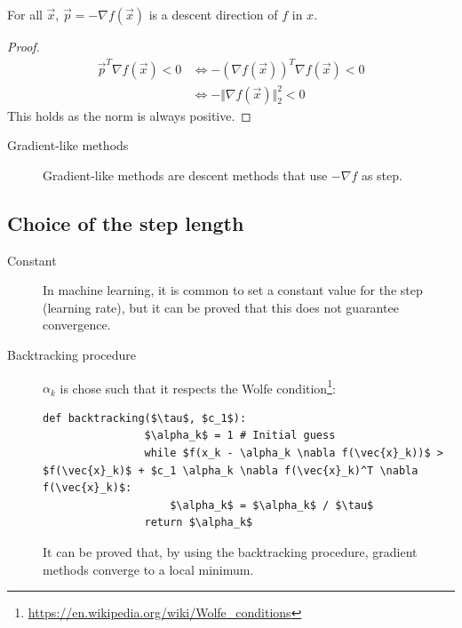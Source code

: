 \begin{theorem}
    For all $\vec{x}$, $\vec{p} = -\nabla f(\vec{x})$ is a descent direction of $f$ in $x$.
\end{theorem}
\begin{proof}
    \[
        \begin{split}
            \vec{p}^T \nabla f(\vec{x}) < 0 &\iff -(\nabla f(\vec{x}))^T \nabla f(\vec{x}) < 0 \\
                &\iff - \Vert \nabla f(\vec{x}) \Vert_2^2 < 0
        \end{split}
    \]
    This holds as the norm is always positive.
\end{proof}

\begin{description}
    \item[Gradient-like methods] 
        Gradient-like methods are descent methods that use $-\nabla f$ as step.
\end{description}


\subsection{Choice of the step length}
\begin{description}
    \item[Constant] 
        In machine learning, it is common to set a constant value for the step (learning rate), 
        but it can be proved that this does not guarantee convergence.
    
    \item[Backtracking procedure] 
        $\alpha_k$ is chose such that it respects the Wolfe condition\footnote{\url{https://en.wikipedia.org/wiki/Wolfe_conditions}}:
        \begin{lstlisting}[mathescape=true, belowskip = -0.8\baselineskip]
            def backtracking($\tau$, $c_1$):
                $\alpha_k$ = 1 # Initial guess
                while $f(x_k - \alpha_k \nabla f(\vec{x}_k))$ > $f(\vec{x}_k)$ + $c_1 \alpha_k \nabla f(\vec{x}_k)^T \nabla f(\vec{x}_k)$:
                    $\alpha_k$ = $\alpha_k$ / $\tau$
                return $\alpha_k$
        \end{lstlisting}
        It can be proved that, by using the backtracking procedure, gradient methods converge to a local minimum.
\end{description}


